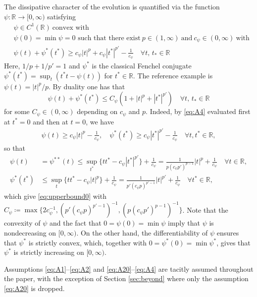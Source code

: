 \documentclass[reqno]{amsart}
\newcommand{\Rz}{\mathbb{R}}
\begin{document}
The dissipative character of the evolution is quantified via  the function $\psi:\Rz \to [0,\infty)$ satisfying 
\begin{align}
  &\psi\in C^1(\Rz) \ \text{convex  with}\nonumber\\[2mm]
  &\text{$\psi(0) = \min\psi =0$ such that there exist} \  p\in(1,\infty)  \ \text{and} \ c_\psi\in(0,\infty) \
    \text{with}  \nonumber\\
  &\psi(t)+\psi^*(t^*) \geq c_\psi |t|^p+c_\psi |t^*|^{p'}-\frac{1}{c_\psi}\quad \forall t,\, t_*
 \in \Rz
  \label{eq:A4}
\end{align}
Here, $1/p+1/p'=1$ and $\psi^*$ is the classical Fenchel conjugate $\psi^*(t^*)= \sup_t(
t^*t-\psi(t))$ for $t^*\in \Rz$.  The reference example is
$\psi(t) =|t|^p/p$.  By duality one has that 
\begin{equation} \psi(t)+\psi^*( t^*) \leq C_\psi(1+ |t|^p+|t^*|^{p'})\quad \forall t,\, t_*
\in \Rz\label{eq:upperbound0}
\end{equation}
for some $C_\psi\in(0,\infty)$ depending on $c_\psi$ and $p$.  Indeed, by \eqref{eq:A4} evaluated first at $t^*=0$ and then at $t=0$, we have
\begin{align*}
    \psi(t) \ge c_\psi |t|^p - \frac{1}{c_\psi}, \quad 
    \psi^*(t^*) \ge c_\psi |t^*|^{p'} - \frac{1}{c_\psi} \quad \forall t,t^* \in \Rz,
\end{align*}
so that
\begin{align*}
    \psi(t) &= \psi^{**}(t) \le \sup_{t^*} \{tt^* -c_\psi |t^*|^{p'}\} + \frac{1}{c_\psi} = \frac{1}{p(c_\psi p')^{p-1}} |t|^p + \frac{1}{c_\psi} \quad \forall t \in \Rz,
    \\
    \psi^*(t^*) & \le \sup_{ t } \{tt^* -c_\psi |t|^{p}\} + \frac{1}{c_\psi} = \frac{1}{p'(c_\psi p)^{p'-1}} |t|^{p'} + \frac{1}{c_\psi} \quad \forall t^* \in \Rz,
\end{align*}
which give \eqref{eq:upperbound0} with $C_\psi\coloneqq \max\{ 2c_\psi^{-1}, (p'(c_\psi p)^{p'-1})^{-1}, (p(c_\psi p')^{p-1})^{-1}\}$.  Note that  the
convexity of $\psi$ and the fact that $0=\psi(0)=\min \psi$ imply that
$\psi$ is nondecreasing on $[0,\infty)$. On the other hand, the
differentiability of $\psi$ ensures that $\psi^*$ is strictly convex,
which, together with $0=\psi^*(0)=\min\psi^*$, gives that $\psi^*$ is
strictly increasing on $[0,\infty)$.

 Assumptions \eqref{eq:A1}--\eqref{eq:A2} and
\eqref{eq:A20}--\eqref{eq:A4} are tacitly assumed  throughout   the paper,
with the exception of Section \ref{sec:beyond} where only the assumption \eqref{eq:A20} is dropped. 
\end{document}
